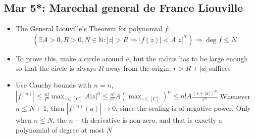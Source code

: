 \documentclass[10pt, oneside]{article}
\let\leq\leqslant
\newcommand{\N}{\mathbb{N}}
\begin{document}
\subsection{Mar 5*: Marechal general de France Liouville}
\begin{itemize}
    \item The General Liouville's Theorem for polynomial $f$:
        \[(\exists A > 0, R > 0, N \in \N : |z| > R \Rightarrow |f(z)| < A|z|^N) \Rightarrow \deg f \leq N\]
    \item To prove this, make a circle around $a$, but the radius has to be large enough so that the circle is always $R$ away from the origin: $r > R + |a|$ suffices
    \item Use Cauchy bounds with $n = n$, $|f^{(n)}| \leq \frac{n!}{r^n} \max_{z \in [C]} A |z|^n \leq \frac{n!}{r^n} A (\max_{z \in [C]})^n \leq n! A \frac{(r + |a|)^N}{r^n}$
    Whenever $n \leq N+1$, then $|f^{(n)}(a)| \rightarrow 0$, since the scaling is of negative power. Only when $n \leq N$, the $n-$th derivative is non-zero, and that is exactly a polynomial of degree at most $N$
\end{itemize}
\end{document}
